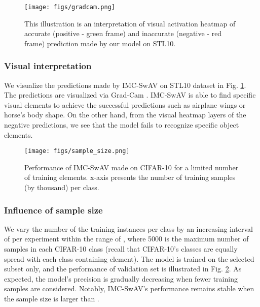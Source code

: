 \documentclass[journal]{IEEEtran}
\begin{document}
\begin{figure}[t]
    \centering
    \texttt{[image: figs/gradcam.png]}
    \caption{This illustration is an interpretation of visual activation heatmap of accurate (positive - green frame) and inaccurate (negative - red frame) prediction made by our model on STL10.
    }
   \label{fig:gradcam}
\end{figure}

\subsubsection{Visual interpretation} 
We visualize the predictions made by IMC-SwAV on STL10 dataset in Fig. \ref{fig:gradcam}. The predictions are visualized via Grad-Cam \cite{8237336}. IMC-SwAV is able to find specific visual elements to achieve the successful predictions such as airplane wings or horse's body shape. On the other hand, from the visual heatmap layers of the negative predictions, we see that the model fails to recognize specific object elements. 

\begin{figure}[t]
    \centering
    \texttt{[image: figs/sample\_size.png]}
    \caption{Performance of IMC-SwAV made on CIFAR-10 for a limited number of training elements. x-axis presents the number of training samples (by thousand) per class.
    }
   \label{fig:sample size}
\end{figure}

\begin{table}[t]
\caption{CIFAR100 - Evaluation on 100 Classes}
\label{tab: cifar100}
\end{table}

\subsubsection{Influence of sample size}  
We vary the number of the training instances per class by an increasing interval of  per experiment within the range of , where 5000 is the maximum number of samples in each CIFAR-10 class (recall that CIFAR-10's classes are equally spread  with each class containing  element). The model is trained on the selected subset only, and the performance of validation set is illustrated in Fig. \ref{fig:sample size}. 
As expected, the model's precision is gradually decreasing when fewer training samples are considered. Notably, IMC-SwAV's performance remains stable when the sample size is larger than .
\end{document}
